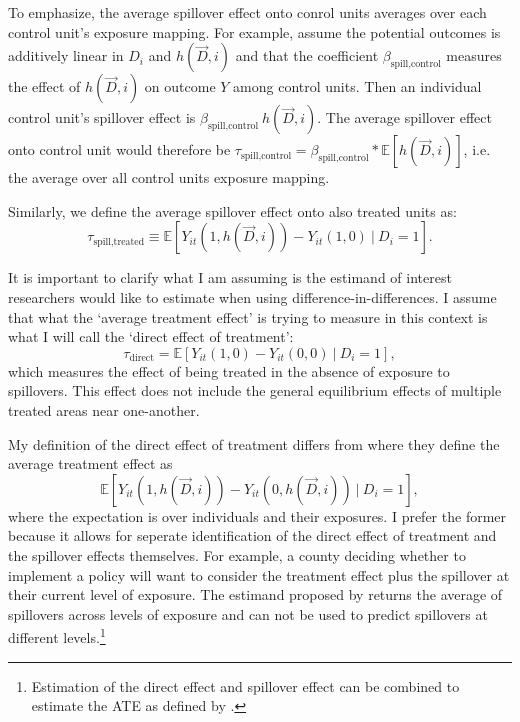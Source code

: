 \documentclass[11pt]{article}
\begin{document}
To emphasize, the average spillover effect onto conrol units averages over each control unit's exposure mapping. For example, assume the potential outcomes is additively linear in $D_i$ and $h(\vec{D}, i)$ and that the coefficient $\beta_{\text{spill,control}}$ measures the effect of $h(\vec{D}, i)$ on outcome $Y$ among control units. Then an individual control unit's spillover effect is $\beta_{\text{spill,control}} \ h(\vec{D}, i)$. The average spillover effect onto control unit would therefore be $\tau_{\text{spill,control}} = \beta_{\text{spill,control}} * \mathbb{E} \left[ h(\vec{D}, i)\right]$, i.e. the average over all control units exposure mapping.

Similarly, we define the average spillover effect onto also treated units as: \[ 
    \tau_{\text{spill,treated}} \equiv \mathbb{E} \left[ Y_{it}(1, h(\vec{D}, i)) - Y_{it}(1, 0) \ \vert \ D_i = 1 \right].
\] 

It is important to clarify what I am assuming is the estimand of interest researchers would like to estimate when using difference-in-differences. I assume that what the `average treatment effect' is trying to measure in this context is what I will call the `direct effect of treatment': \[
    \tau_{\text{direct}} = \mathbb{E} \left[ Y_{it}(1, 0) - Y_{it}(0, 0) \ \vert \ D_i = 1 \right],
\] 
which measures the effect of being treated in the absence of exposure to spillovers. This effect does not include the general equilibrium effects of multiple treated areas near one-another.

My definition of the direct effect of treatment differs from \citet{Sävje_Aronow_Hudgens_2019} where they define the average treatment effect as \[ 
    \mathbb{E} \left[ Y_{it}(1, h(\vec{D}, i)) - Y_{it}(0, h(\vec{D}, i)) \ \vert \ D_i = 1 \right],
\] 
where the expectation is over individuals and their exposures. I prefer the former because it allows for seperate identification of the direct effect of treatment and the spillover effects themselves. For example, a county deciding whether to implement a policy will want to consider the treatment effect plus the spillover at their current level of exposure. The estimand proposed by \citet{Sävje_Aronow_Hudgens_2019} returns the average of spillovers across levels of exposure and can not be used to predict spillovers at different levels.\footnote{Estimation of the direct effect and spillover effect can be combined to estimate the ATE as defined by \citet{Sävje_Aronow_Hudgens_2019}.}


\end{document}
